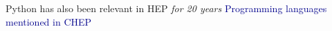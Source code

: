 \documentclass[aspectratio=169]{beamer}
\begin{document}
\begin{frame}{Python has also been relevant in HEP {\it for 20 years}}
\vspace{0.25 cm}
\textcolor{darkblue}{\mbox{\hspace{-0.5 cm}}Programming languages mentioned in CHEP }

\vspace{-0.03 cm}
\begin{columns}
\end{columns}
\end{frame}
\end{document}
